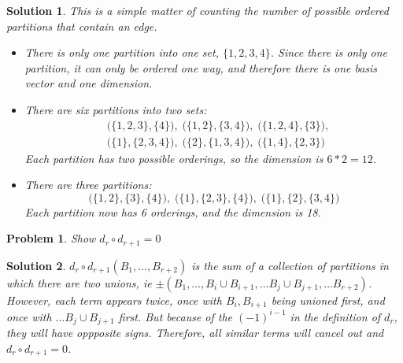 \documentclass{article}
\theoremstyle{normal}
\newtheorem{problem}{Problem}
\theoremstyle{thmit}
\newtheorem*{solution}{Solution}
\begin{document}
    \begin{solution}
    This is a simple matter of counting the number of possible ordered partitions that contain an edge.
    \begin{itemize}
        \item[$r=-1$]
            There is only one partition into one set, $\{1,2,3,4\}$. Since there is only one
            partition, it can only be ordered one way, and therefore there is one basis vector
            and one dimension.
        \item[$r=0$]
            There are six partitions into two sets:
            \begin{equation}
                \begin{split}
                    &\big(\{1,2,3\},\{4\}\big),\;\big(\{1,2\},\{3,4\}\big),\;
                        \big(\{1,2,4\},\{3\}\big),\\
                    &\big(\{1\},\{2,3,4\}\big),\;\big(\{2\},\{1,3,4\}\big),\;
                        \big(\{1,4\},\{2,3\}\big)
                \end{split}
            \end{equation}
            Each partition has two possible orderings, so the dimension is $6*2=12$. 
        \item[$r=1$]
            There are three partitions:
            \begin{equation}
                \big(\{1,2\},\{3\},\{4\}\big),\;
                \big(\{1\},\{2,3\},\{4\}\big),\;
                \big(\{1\},\{2\},\{3,4\}\big)
            \end{equation}
            Each partition now has 6 orderings, and the dimension is 18.
    \end{itemize}
    \end{solution}
    \begin{problem}
        Show $d_r \circ d_{r+1} =0$
    \end{problem}
    \begin{solution}
        $d_r \circ d_{r+1} (B_1, \dots, B_{r+2})$ is the sum of a collection of partitions in which there
        are two unions, ie $\pm(B_1, \dots, B_i \cup B_{i+1}, \dots B_j \cup B_{j+1}, \dots B_{r+2})$.
        However, each term appears twice, once with $B_i, B_{i+1}$ being unioned first, and once with
        $\dots B_j \cup B_{j+1}$ first. But because of the $(-1)^{i-1}$ in the definition of $d_r$, they
        will have oppposite signs. Therefore, all similar terms will cancel out and $d_r \circ d_{r+1} =0$.
    \end{solution}
\end{document}
